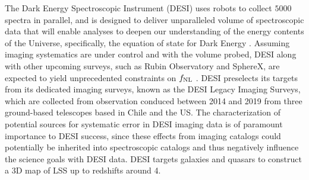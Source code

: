 The Dark Energy Spectroscopic Instrument (DESI) uses robots to collect $5000$ spectra in parallel, and is designed to deliver unparalleled volume of spectroscopic data that will enable analyses to deepen our understanding of the energy contents of the Universe, specifically, the equation of state for Dark Energy \citep{aghamousa2016desi}. Assuming imaging systematics are under control and with the volume probed, DESI along with other upcoming surveys, such as Rubin Observatory and SphereX, are expected to yield unprecedented constraints on $f_{\rm NL}$ \citep[see, e.g.,][]{Heinrich2022AAS...24020203H}. DESI preselects its targets from its dedicated imaging surveys, known as the DESI Legacy Imaging Surveys, which are collected from observation conduced between 2014 and 2019 from three ground-based telescopes based in Chile and the US. The characterization of potential sources for systematic error in DESI imaging data is of paramount importance to DESI success, since these effects from imaging catalogs could potentially be inherited into spectroscopic catalogs and thus negatively influence the science goals with DESI data. DESI targets galaxies and quasars to construct a 3D map of LSS up to redshifts around 4. 

